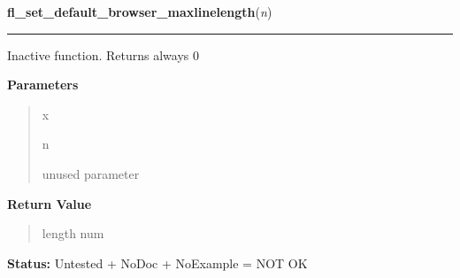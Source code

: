     \label{xformslib:library:fl_set_default_browser_maxlinelength}

    \vspace{0.5ex}

\hspace{.8\funcindent}\begin{boxedminipage}{\funcwidth}

    \raggedright \textbf{fl\_set\_default\_browser\_maxlinelength}(\textit{n})

    \vspace{-1.5ex}

    \rule{\textwidth}{0.5\fboxrule}
\setlength{\parskip}{2ex}
    Inactive function. Returns always 0

\setlength{\parskip}{1ex}
      \textbf{Parameters}
      \vspace{-1ex}

      \begin{quote}
        \begin{Ventry}{x}

          \item[n]

          unused parameter

        \end{Ventry}

      \end{quote}

      \textbf{Return Value}
    \vspace{-1ex}

      \begin{quote}
      length num

      \end{quote}

\textbf{Status:} Untested + NoDoc + NoExample = NOT OK



    \end{boxedminipage}

    \label{xformslib:library:fl_set_browser_hscroll_callback}

    \vspace{0.5ex}

